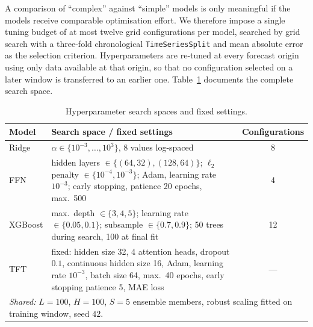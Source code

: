 \documentclass[11pt,a4paper]{article}
\begin{document}
A comparison of ``complex'' against ``simple'' models is only meaningful if
the models receive comparable optimisation effort. We therefore impose a
single tuning budget of at most twelve grid configurations per model, searched
by grid search with a three-fold chronological \texttt{TimeSeriesSplit} and
mean absolute error as the selection criterion. Hyperparameters are re-tuned
at every forecast origin using only data available at that origin, so that no
configuration selected on a later window is transferred to an earlier one.
Table~\ref{tab:hyperparams} documents the complete search space.

\begin{table}[htbp]
    \centering
    \small
    \caption{Hyperparameter search spaces and fixed settings.}
    \label{tab:hyperparams}
    \begin{tabularx}{\textwidth}{l X c}
        \toprule
        Model & Search space / fixed settings & Configurations \\
        \midrule
        Ridge & $\alpha \in \{10^{-3}, \dots, 10^{3}\}$, 8 values log-spaced & 8 \\
        FFN & hidden layers $\in \{(64,32),(128,64)\}$;
              $\ell_2$ penalty $\in \{10^{-4}, 10^{-3}\}$;
              Adam, learning rate $10^{-3}$;
              early stopping, patience 20 epochs, max.\ 500 & 4 \\
        XGBoost & max.\ depth $\in \{3,4,5\}$;
                  learning rate $\in \{0.05, 0.1\}$;
                  subsample $\in \{0.7, 0.9\}$;
                  50 trees during search, 100 at final fit & 12 \\
        TFT & fixed: hidden size 32, 4 attention heads, dropout $0.1$,
              continuous hidden size 16, Adam, learning rate $10^{-3}$,
              batch size 64, max.\ 40 epochs, early stopping patience 5,
              MAE loss & --- \\
        \midrule
        \multicolumn{3}{l}{\textit{Shared:} $L=100$, $H=100$, $S=5$ ensemble
        members, robust scaling fitted on training window, seed $42$.} \\
        \bottomrule
    \end{tabularx}
\end{table}
\end{document}
